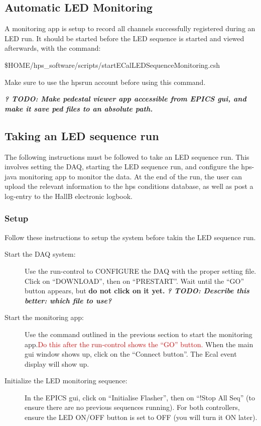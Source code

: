 \documentclass[12pt]{article}
\begin{document}
\subsection{Automatic LED Monitoring}
A monitoring app is setup to record all channels successfully registered during an LED run.  It should be started before the LED sequence is started and viewed afterwards, with the command: \begin{center}\$HOME/hps\_software/scripts/startECalLEDSequenceMonitoring.csh\end{center} Make sure to use the hpsrun account before using this command.
  
  {\bf\it ? TODO: Make pedestal viewer app accessible from EPICS gui, and make it save ped files to an absolute path.}

    
\subsection{Taking an LED sequence run}
The following instructions must be followed to take an LED sequence run. This involves setting the DAQ, starting the LED sequence run, and configure the hps-java monitoring app to monitor the data. At the end of the run, the user can upload the relevant information to the hps conditions database, as well as post a log-entry to the HallB electronic logbook.

\subsubsection{Setup}
Follow these instructions to setup the system before takin the LED sequence run.

\begin{description}
\item[Start the DAQ system: ]{Use the run-control to CONFIGURE the DAQ with the proper setting file. Click on ``DOWNLOAD'', then on ``PRESTART''. Wait until the ``GO'' button appears, but {\bf do not click on it yet.}
\bf\it ? TODO: Describe this better: which file to use?
 }
\item[Start the monitoring app: ]{Use the command outlined in the previous section to start the monitoring app.\textcolor{red}{Do this after the run-control shows the ``GO'' button.} When the main gui window shows up, click on the ``Connect button''. The Ecal event display will show up.}
\item[Initialize the LED monitoring sequence:]{In the EPICS gui, click on ``Initialise Flasher'', then on ``!Stop All Seq'' (to ensure there are no previous sequences running). For both controllers, ensure the LED ON/OFF button is set to OFF (you will turn it ON later).} 
\end{description}
      
\end{document}
